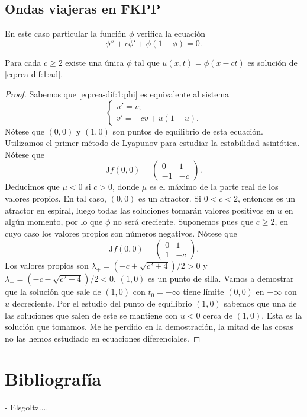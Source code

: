 \documentclass{article}
\begin{document}
\subsection{Ondas viajeras en FKPP}

En este caso particular la función $\phi$ verifica la ecuación
\begin{equation}
  \label{eq:rea-dif:1:phi}
  \phi'' + c \phi' + \phi(1-\phi) = 0.
\end{equation}

\begin{lemma}
  Para cada $c \ge 2$ existe una única $\phi$ tal que $u(x,t) = \phi(x-ct)$ es solución de
  \eqref{eq:rea-dif:1:ad}.
\end{lemma}
\begin{proof}
  Sabemos que \eqref{eq:rea-dif:1:phi} es equivalente al sistema
  \begin{equation}
    \label{eq:rea-dif:1:phi:s}
    \begin{cases}
      u' = v; \\
      v' = -c v + u (1-u).
    \end{cases}
  \end{equation}
  Nótese que $(0,0)$ y $(1,0)$ son puntos de equilibrio de esta ecuación. Utilizamos el primer
  método de Lyapunov para estudiar la estabilidad asintótica. Nótese que
  \[\mathrm{J}f(0,0) =\left(
      \begin{matrix}
        0 & 1 \\ -1 & -c
      \end{matrix}
    \right). \] Deducimos que $\mu < 0$ si $c > 0$, donde $\mu$ es el máximo de la parte real de los
  valores propios. En tal caso, $(0,0)$ es un atractor. Si $0 < c < 2$, entonces es un atractor en
  espiral, luego todas las soluciones tomarán valores positivos en $u$ en algún momento, por lo que
  $\phi$ no será creciente. Suponemos pues que $c \ge 2$, en cuyo caso los valores propios son
  números negativos. Nótese que
  \[\mathrm{J}f(0,0) =\left(
      \begin{matrix}
        0 & 1 \\ 1 & -c
      \end{matrix}
    \right). \] Los valores propios son $\lambda_+ = (-c + \sqrt{c^2 + 4})/ 2 > 0$ y
  $\lambda_- = (-c - \sqrt{c^2 + 4})/ 2 < 0$. $(1,0)$ es un punto de silla. Vamos a demostrar que la
  solución que sale de $(1,0)$ con $t_0 = -\infty$ tiene límite $(0,0)$ en $+\infty$ con $u$
  decreciente. Por el estudio del punto de equilibrio $(1,0)$ sabemos que una de las soluciones que
  salen de este se mantiene con $u < 0$ cerca de $(1,0)$. Esta es la solución que tomamos. Me he
  perdido en la demostración, la mitad de las cosas no las hemos estudiado en ecuaciones
  diferenciales.
\end{proof}



\section{Bibliografía}

- Elsgoltz....
\end{document}
